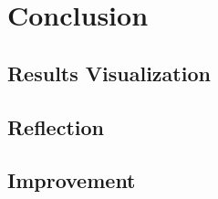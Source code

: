 \section{Conclusion}

\subsection{Results Visualization}

\subsection{Reflection}

\subsection{Improvement}